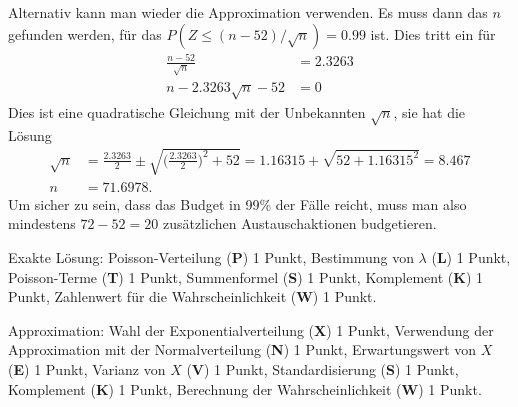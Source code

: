 \begin{loesung}
\begin{teilaufgaben}
Alternativ kann man wieder die Approximation verwenden.
Es muss dann das $n$ gefunden werden, für das $P(Z\le (n-52)/\sqrt{n})=0.99$
ist.
Dies tritt ein für
\begin{align*}
\frac{n-52}{\sqrt{n}}&=2.3263\\
n-2.3263\sqrt{n}-52&=0
\end{align*}
Dies ist eine quadratische Gleichung mit der Unbekannten $\sqrt{n}$, sie hat
die Lösung
\begin{align*}
\sqrt{n}
&=
\frac{2.3263}{2}\pm\sqrt{\biggl(\frac{2.3263}{2}\biggr)^2+52}
=
1.16315 + \sqrt{52+1.16315^2}
=
8.467
\\
n&=71.6978.
\end{align*}
Um sicher zu sein, dass das Budget in 99\% der Fälle reicht, muss man
also mindestens $72-52=20$ zusätzlichen Austauschaktionen budgetieren.
\qedhere
\end{teilaufgaben}
\end{loesung}

\begin{bewertung}
Exakte Lösung: Poisson-Verteilung ({\bf P}) 1 Punkt,
Bestimmung von $\lambda$ ({\bf L}) 1 Punkt,
Poisson-Terme ({\bf T}) 1 Punkt,
Summenformel ({\bf S}) 1 Punkt,
Komplement ({\bf K}) 1 Punkt,
Zahlenwert für die Wahrscheinlichkeit ({\bf W}) 1 Punkt.

Approximation: Wahl der Exponentialverteilung ({\bf X}) 1 Punkt,
Verwendung der Approximation mit der Normalverteilung ({\bf N}) 1 Punkt,
Erwartungswert von $X$ ({\bf E}) 1 Punkt,
Varianz von $X$ ({\bf V}) 1 Punkt,
Standardisierung ({\bf S}) 1 Punkt,
Komplement ({\bf K}) 1 Punkt,
Berechnung der Wahrscheinlichkeit ({\bf W}) 1 Punkt.
\end{bewertung}



